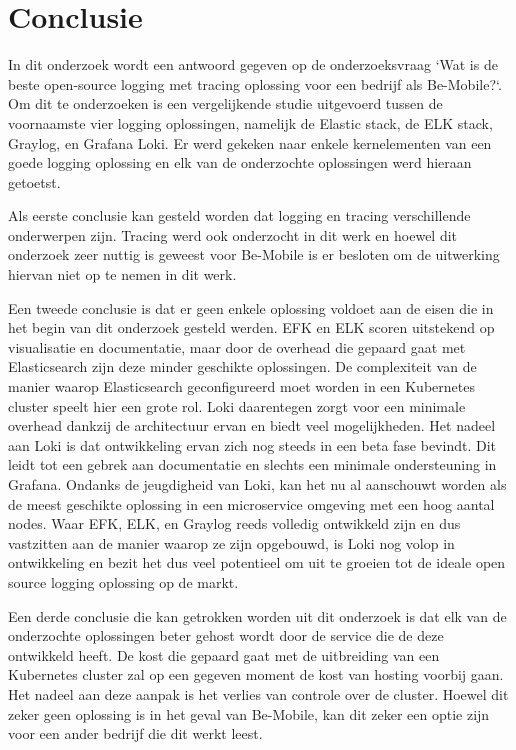 
\chapter{Conclusie}
\label{ch:conclusie}

In dit onderzoek wordt een antwoord gegeven op de onderzoeksvraag `Wat is de beste open-source logging met tracing oplossing voor een bedrijf als Be-Mobile?`. Om dit te onderzoeken is een vergelijkende studie uitgevoerd tussen de voornaamste vier logging oplossingen, namelijk de Elastic stack, de ELK stack, Graylog, en Grafana Loki. Er werd gekeken naar enkele kernelementen van een goede logging oplossing en elk van de onderzochte oplossingen werd hieraan getoetst.

Als eerste conclusie kan gesteld worden dat logging en tracing verschillende onderwerpen zijn. Tracing werd ook onderzocht in dit werk en hoewel dit onderzoek zeer nuttig is geweest voor Be-Mobile is er besloten om de uitwerking hiervan niet op te nemen in dit werk.

Een tweede conclusie is dat er geen enkele oplossing voldoet aan de eisen die in het begin van dit onderzoek gesteld werden. EFK en ELK scoren uitstekend op visualisatie en documentatie, maar door de overhead die gepaard gaat met Elasticsearch zijn deze minder geschikte oplossingen. De complexiteit van de manier waarop Elasticsearch geconfigureerd moet worden in een Kubernetes cluster speelt hier een grote rol. Loki daarentegen zorgt voor een minimale overhead dankzij de architectuur ervan en biedt veel mogelijkheden. Het nadeel aan Loki is dat ontwikkeling ervan zich nog steeds in een beta fase bevindt. Dit leidt tot een gebrek aan documentatie en slechts een minimale ondersteuning in Grafana. Ondanks de jeugdigheid van Loki, kan het nu al aanschouwt worden als de meest geschikte oplossing in een microservice omgeving met een hoog aantal nodes. Waar EFK, ELK, en Graylog reeds volledig ontwikkeld zijn en dus vastzitten aan de manier waarop ze zijn opgebouwd, is Loki nog volop in ontwikkeling en bezit het dus veel potentieel om uit te groeien tot de ideale open source logging oplossing op de markt.

Een derde conclusie die kan getrokken worden uit dit onderzoek is dat elk van de onderzochte oplossingen beter gehost wordt door de service die de deze ontwikkeld heeft. De kost die gepaard gaat met de uitbreiding van een Kubernetes cluster zal op een gegeven moment de kost van hosting voorbij gaan. Het nadeel aan deze aanpak is het verlies van controle over de cluster. Hoewel dit zeker geen oplossing is in het geval van Be-Mobile, kan dit zeker een optie zijn voor een ander bedrijf die dit werkt leest.

